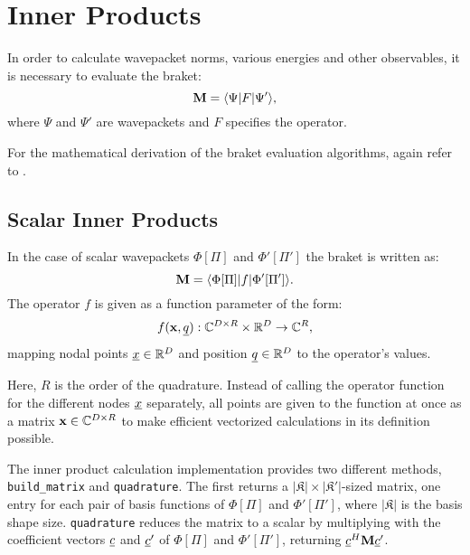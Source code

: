 \section{Inner Products}

In order to calculate wavepacket norms, various energies and other observables,
it is necessary to evaluate the braket:
\begin{equation}
  \label{eq:braket}
  \mathbf{M} = \langle \Psi | F | \Psi' \rangle,
\end{equation}
where $\Psi$ and $\Psi'$ are wavepackets and $F$ specifies the operator.

For the mathematical derivation of the braket evaluation algorithms, again refer
to \cite{B_master_thesis}.


\subsection{Scalar Inner Products}

In the case of scalar wavepackets $\Phi[\Pi]$ and $\Phi'[\Pi']$ the braket is written as:
\begin{equation}
  \mathbf{M} = \langle \Phi[\Pi] | f | \Phi'[\Pi'] \rangle.
\end{equation}
The operator $f$ is given as a function parameter of the form:
\begin{equation}
  f(\mathbf{x}, \underline{q}) : \mathbb{C}^{D \times R} \times \mathbb{R}^D \rightarrow
  \mathbb{C}^R,
\end{equation}
mapping nodal points $\underline{x} \in \mathbb{R}^D$ and position
$\underline{q} \in \mathbb{R}^D$ to the operator's values.

Here, $R$ is the order of the quadrature.
Instead of calling the operator function for the different nodes $\underline{x}$
separately, all points are given to the function at once as a matrix $\mathbf{x}
\in \mathbb{C}^{D \times R}$ to make efficient vectorized calculations in its
definition possible.

The inner product calculation implementation provides two different methods,
\texttt{build\_matrix} and \texttt{quadrature}.
The first returns a $|\mathfrak{K}| \times |\mathfrak{K'}|$-sized matrix, one
entry for each pair of basis functions of $\Phi[\Pi]$ and $\Phi'[\Pi']$, where
$|\mathfrak{K}|$ is the basis shape size.
\texttt{quadrature} reduces the matrix to a scalar by multiplying with the
coefficient vectors $\underline{c}$ and $\underline{c}'$ of $\Phi[\Pi]$ and $\Phi'[\Pi']$, returning
$\underline{c}^H \mathbf{M} \underline{c}'$.

